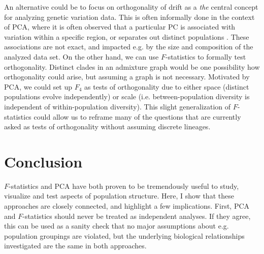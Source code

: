 \documentclass[12pt,fullpage, a4paper]{article}
\begin{document}

An alternative could be to focus on orthogonality of drift as a \emph{the} central concept for analyzing genetic variation data.
This is often informally done in the context of PCA, where it is often observed that a particular PC is associated with variation within a specific region, or separates out distinct populations \citep{cavalli-sforza1994}. These associations are not exact, and impacted e.g. by the size and composition of the analyzed data set. On the other hand, we can use $F$-statistics to formally test orthogonality. Distinct clades in an admixture graph would be one possibility how orthogonality could arise, but assuming a graph is not necessary. Motivated by PCA, we could set up $F_4$ as tests of orthogonality due to either space (distinct populations evolve independently) or scale (i.e. between-population diversity is independent of within-population diversity). This slight generalization of $F$-statistics could allow us to reframe many of the questions that are currently asked as tests of orthogonality without assuming discrete lineages.

\section{Conclusion}
$F$-statistics and PCA have both proven to be tremendously useful to study, visualize and test aspects of population structure. Here, I show that these approaches are closely connected, and highlight a few implications. First, PCA and $F$-statistics should never be treated as independent analyses. If they agree, this can be used as a sanity check that no major assumptions about e.g. population groupings are violated, but the underlying biological relationships investigated are the same in both approaches.  
\end{document}
